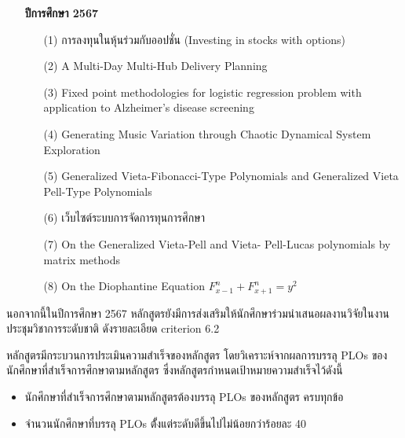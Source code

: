 \begin{enumerate}
\item[]\textbf{ปีการศึกษา 2567}
\begin{itemize}
	\item[(1)] การลงทุนในหุ้นร่วมกับออปชั่น (Investing in stocks with options)
	
	\item[(2)] A Multi-Day Multi-Hub Delivery Planning
	
	\item[(3)] Fixed point methodologies for logistic regression problem with application to Alzheimer’s disease screening     
	
	\item[(4)] Generating Music Variation through Chaotic Dynamical System Exploration
	
	\item[(5)] Generalized Vieta-Fibonacci-Type Polynomials and Generalized Vieta Pell-Type Polynomials
	
	\item[(6)] เว็บไซต์ระบบการจัดการทุนการศึกษา
	
	
	\item[(7)] On the Generalized Vieta-Pell and Vieta- Pell-Lucas polynomials by matrix methods  
	
	
	\item[(8)] On the Diophantine Equation $F^n_{x-1} + F^n_{x+1} = y^2$
	
\end{itemize}
\end{enumerate}

นอกจากนี้ในปีการศึกษา 2567 หลักสูตรยังมีการส่งเสริมให้นักศึกษาร่วมนำเสนอผลงานวิจัยในงานประชุมวิชาการระดับชาติ ดังรายละเอียด criterion 6.2

\begin{doclist}
\end{doclist}

หลักสูตรมีกระบวนการประเมินความสำเร็จของหลักสูตร โดยวิเคราะห์จากผลการบรรลุ PLOs ของนักศึกษาที่สำเร็จการศึกษาตามหลักสูตร ซึ่งหลักสูตรกำหนดเป้าหมายความสำเร็จไว้ดังนี้
\begin{itemize}
	\item นักศึกษาที่สำเร็จการศึกษาตามหลักสูตรต้องบรรลุ PLOs ของหลักสูตร ครบทุกข้อ
	\item จำนวนนักศึกษาที่บรรลุ PLOs ตั้้งแต่ระดับดีขึ้นไปไม่น้อยกว่าร้อยละ 40
\end{itemize}

